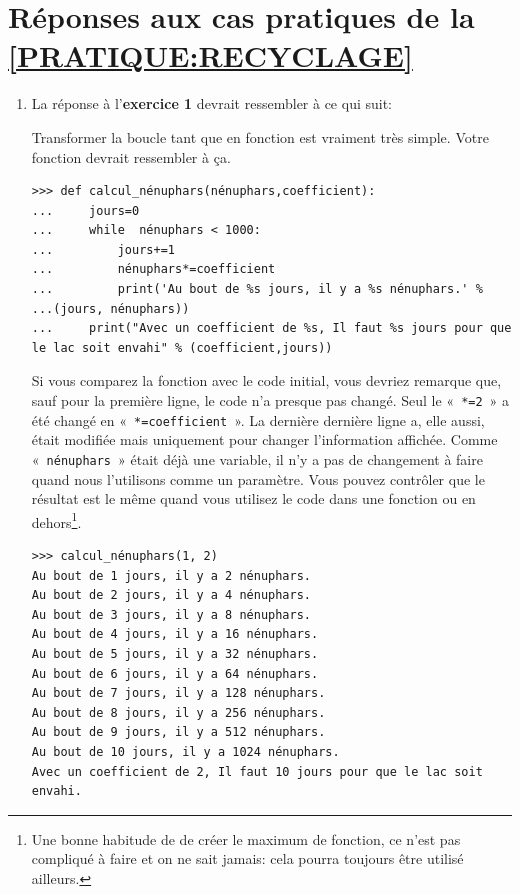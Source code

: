 \section{Réponses aux cas pratiques de la \autoref{PRATIQUE:RECYCLAGE}\label{REPONSES:RECYCLAGE}}
\begin{enumerate}
\item La réponse à l'\textbf{exercice 1} devrait ressembler à ce qui suit: 

Transformer la boucle tant que en fonction est vraiment très simple. Votre fonction devrait ressembler à ça.

\begin{Verbatim}[frame=single,rulecolor=\color{mbleu}, label=à taper]
>>> def calcul_nénuphars(nénuphars,coefficient):
...     jours=0
...     while  nénuphars < 1000:
...         jours+=1
...         nénuphars*=coefficient
...         print('Au bout de %s jours, il y a %s nénuphars.' % 
...(jours, nénuphars))
...     print("Avec un coefficient de %s, Il faut %s jours pour que le lac soit envahi" % (coefficient,jours))
\end{Verbatim}

Si vous comparez la fonction avec le code initial, vous devriez remarque que, sauf pour la première ligne, le code n'a presque pas changé. Seul le «~\texttt{*=2}~» a été changé en «~\texttt{*=coefficient}~». La dernière dernière ligne a, elle aussi, était modifiée mais uniquement pour changer l'information affichée. Comme «~\texttt{nénuphars}~» était déjà une variable, il n'y a pas de changement à faire quand nous l'utilisons comme un paramètre. Vous pouvez contrôler que le résultat est le même quand vous utilisez le code dans une fonction ou en dehors\footnote{Une bonne habitude de de créer le maximum de fonction, ce n'est pas compliqué à faire et on ne sait jamais: cela pourra toujours être utilisé ailleurs.}.

\begin{Verbatim}[frame=single,rulecolor=\color{mbleu}, label=à taper]
>>> calcul_nénuphars(1, 2)
Au bout de 1 jours, il y a 2 nénuphars.
Au bout de 2 jours, il y a 4 nénuphars.
Au bout de 3 jours, il y a 8 nénuphars.
Au bout de 4 jours, il y a 16 nénuphars.
Au bout de 5 jours, il y a 32 nénuphars.
Au bout de 6 jours, il y a 64 nénuphars.
Au bout de 7 jours, il y a 128 nénuphars.
Au bout de 8 jours, il y a 256 nénuphars.
Au bout de 9 jours, il y a 512 nénuphars.
Au bout de 10 jours, il y a 1024 nénuphars.
Avec un coefficient de 2, Il faut 10 jours pour que le lac soit envahi.
\end{Verbatim}


\end{enumerate}
